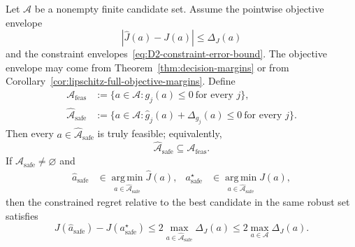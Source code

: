 \begin{proposition}
\label{prop:robust-constrained-regret}
Let $\mathcal A$ be a nonempty finite candidate set.  Assume the pointwise
objective envelope
\begin{equation}
  |\hat J(a)-J(a)|\leq\Delta_J(a)
  \label{eq:D2-objective-envelope-for-constrained}
\end{equation}
and the constraint envelopes~\eqref{eq:D2-constraint-error-bound}.  The
objective envelope may come from Theorem~\ref{thm:decision-margins} or from
Corollary~\ref{cor:lipschitz-full-objective-margins}.  Define
\begin{align}
  \mathcal A_{\mathrm{feas}}
  &:=\{a\in\mathcal A:g_j(a)\leq0\ \text{for every }j\},
  \\
  \widehat{\mathcal A}_{\mathrm{safe}}
  &:=\{a\in\mathcal A:
       \hat g_j(a)+\Delta_{g_j}(a)\leq0\ \text{for every }j\}.
  \label{eq:D2-robust-safe-set}
\end{align}
Then every $a\in\widehat{\mathcal A}_{\mathrm{safe}}$ is truly feasible;
equivalently,
\begin{equation}
  \widehat{\mathcal A}_{\mathrm{safe}}
  \subseteq\mathcal A_{\mathrm{feas}}.
  \label{eq:D2-robust-subset}
\end{equation}
If $\widehat{\mathcal A}_{\mathrm{safe}}\neq\varnothing$ and
\begin{align*}
  \hat a_{\mathrm{safe}}
  &\in\operatorname*{arg\,min}_{a\in\widehat{\mathcal A}_{\mathrm{safe}}}
       \hat J(a),
  &
  a_{\mathrm{safe}}^\star
  &\in\operatorname*{arg\,min}_{a\in\widehat{\mathcal A}_{\mathrm{safe}}}
       J(a),
\end{align*}
then the constrained regret relative to the best candidate in the same robust
set satisfies
\begin{equation}
  J(\hat a_{\mathrm{safe}})-J(a_{\mathrm{safe}}^\star)
  \leq 2\max_{a\in\widehat{\mathcal A}_{\mathrm{safe}}}\Delta_J(a)
  \leq 2\max_{a\in\mathcal A}\Delta_J(a).
  \label{eq:D2-safe-set-regret}
\end{equation}


\end{proposition}
